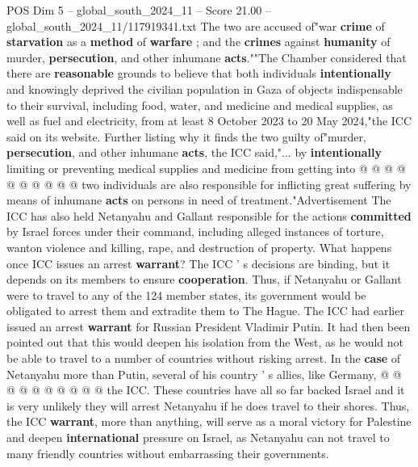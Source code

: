 \begin{textsample}{POS Dim 5 – global\_south\_2024\_11 – Score 21.00 – global\_south\_2024\_11/117919341.txt}
The two are accused of"war \textbf{crime} of \textbf{starvation} as a \textbf{method} of \textbf{warfare} ; and the \textbf{crimes} against \textbf{humanity} of murder, \textbf{persecution}, and other inhumane \textbf{acts}.""The Chamber considered that there are \textbf{reasonable} grounds to believe that both individuals \textbf{intentionally} and knowingly deprived the civilian population in Gaza of objects indispensable to their survival, including food, water, and medicine and medical supplies, as well as fuel and electricity, from at least 8 October 2023 to 20 May 2024,"the ICC said on its website.
Further listing why it finds the two guilty of"murder, \textbf{persecution}, and other inhumane \textbf{acts}, the ICC said,"... by \textbf{intentionally} limiting or preventing medical supplies and medicine from getting into @ @ @ @ @ @ @ @ @ @ two individuals are also responsible for inflicting great suffering by means of inhumane \textbf{acts} on persons in need of treatment."Advertisement The ICC has also held Netanyahu and Gallant responsible for the actions \textbf{committed} by Israel forces under their command, including alleged instances of torture, wanton violence and killing, rape, and destruction of property.
What happens once ICC issues an arrest \textbf{warrant}?
The ICC ' s decisions are binding, but it depends on its members to ensure \textbf{cooperation}.
Thus, if Netanyahu or Gallant were to travel to any of the 124 member states, its government would be obligated to arrest them and extradite them to The Hague.
The ICC had earlier issued an arrest \textbf{warrant} for Russian President Vladimir Putin.
It had then been pointed out that this would deepen his isolation from the West, as he would not be able to travel to a number of countries without risking arrest.
In the \textbf{case} of Netanyahu more than Putin, several of his country ' s allies, like Germany, @ @ @ @ @ @ @ @ @ @ the ICC.
These countries have all so far backed Israel and it is very unlikely they will arrest Netanyahu if he does travel to their shores.
Thus, the ICC \textbf{warrant}, more than anything, will serve as a moral victory for Palestine and deepen \textbf{international} pressure on Israel, as Netanyahu can not travel to many friendly countries without embarrassing their governments.

\end{textsample}
